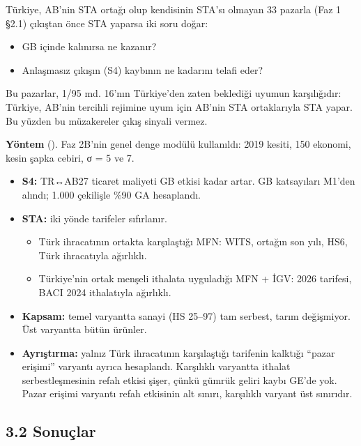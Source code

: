 Türkiye, AB'nin STA ortağı olup kendisinin STA'sı olmayan 33 pazarla (Faz 1 §2.1) çıkıştan önce STA yaparsa iki soru doğar:

\begin{itemize}
\tightlist
\item
  GB içinde kalınırsa ne kazanır?
\item
  Anlaşmasız çıkışın (S4) kaybının ne kadarını telafi eder?
\end{itemize}

Bu pazarlar, 1/95 md. 16'nın Türkiye'den zaten beklediği uyumun karşılığıdır: Türkiye, AB'nin tercihli rejimine uyum için AB'nin STA ortaklarıyla STA yapar. Bu yüzden bu müzakereler çıkış sinyali vermez.

\textbf{Yöntem} (). Faz 2B'nin genel denge modülü kullanıldı: 2019 kesiti, 150 ekonomi, kesin şapka cebiri, σ = 5 ve 7.

\begin{itemize}
\tightlist
\item
  \textbf{S4:} TR↔AB27 ticaret maliyeti GB etkisi kadar artar. GB katsayıları M1'den alındı; 1.000 çekilişle \%90 GA hesaplandı.
\item
  \textbf{STA:} iki yönde tarifeler sıfırlanır.

  \begin{itemize}
  \tightlist
  \item
    Türk ihracatının ortakta karşılaştığı MFN: WITS, ortağın son yılı, HS6, Türk ihracatıyla ağırlıklı.
  \item
    Türkiye'nin ortak menşeli ithalata uyguladığı MFN + İGV: 2026 tarifesi, BACI 2024 ithalatıyla ağırlıklı.
  \end{itemize}
\item
  \textbf{Kapsam:} temel varyantta sanayi (HS 25--97) tam serbest, tarım değişmiyor. Üst varyantta bütün ürünler.
\item
  \textbf{Ayrıştırma:} yalnız Türk ihracatının karşılaştığı tarifenin kalktığı ``pazar erişimi'' varyantı ayrıca hesaplandı. Karşılıklı varyantta ithalat serbestleşmesinin refah etkisi şişer, çünkü gümrük geliri kaybı GE'de yok. Pazar erişimi varyantı refah etkisinin alt sınırı, karşılıklı varyant üst sınırıdır.
\end{itemize}

\hypertarget{02c_hazirlik-32-sonuuxe7lar}{%
\subsection{3.2 Sonuçlar}\label{02c_hazirlik-32-sonuuxe7lar}}

